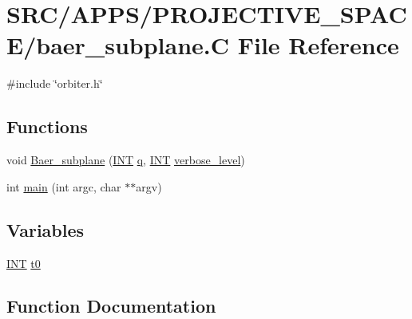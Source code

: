 \hypertarget{baer__subplane_8_c}{}\section{S\+R\+C/\+A\+P\+P\+S/\+P\+R\+O\+J\+E\+C\+T\+I\+V\+E\+\_\+\+S\+P\+A\+C\+E/baer\+\_\+subplane.C File Reference}
\label{baer__subplane_8_c}
{\ttfamily \#include \char`\"{}orbiter.\+h\char`\"{}}\newline
\subsection*{Functions}
\begin{DoxyCompactItemize}
\item 
void \mbox{\hyperlink{baer__subplane_8_c_a96de72c7f68c8230d5c55b7155ca1430}{Baer\+\_\+subplane}} (\mbox{\hyperlink{galois_8h_a09fddde158a3a20bd2dcadb609de11dc}{I\+NT}} \mbox{\hyperlink{simeon_8_c_a92cbb483a3b27ae1a0dbfcb125ce216f}{q}}, \mbox{\hyperlink{galois_8h_a09fddde158a3a20bd2dcadb609de11dc}{I\+NT}} \mbox{\hyperlink{simeon_8_c_a818073fbcc2f439e7c56952f67386122}{verbose\+\_\+level}})
\item 
int \mbox{\hyperlink{baer__subplane_8_c_a3c04138a5bfe5d72780bb7e82a18e627}{main}} (int argc, char $\ast$$\ast$argv)
\end{DoxyCompactItemize}
\subsection*{Variables}
\begin{DoxyCompactItemize}
\item 
\mbox{\hyperlink{galois_8h_a09fddde158a3a20bd2dcadb609de11dc}{I\+NT}} \mbox{\hyperlink{baer__subplane_8_c_a4268f4fe222ffb119218a0199f5e1904}{t0}}
\end{DoxyCompactItemize}


\subsection{Function Documentation}
\mbox{\label{baer__subplane_8_c_a96de72c7f68c8230d5c55b7155ca1430}} 
